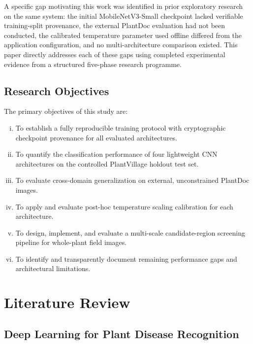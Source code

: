 \documentclass[pdflatex,sn-mathphys-num]{sn-jnl}
\theoremstyle{thmstyleone}%
\theoremstyle{thmstyletwo}%
\theoremstyle{thmstylethree}%
\begin{document}
A specific gap motivating this work was identified in prior exploratory research on the
same system: the initial MobileNetV3-Small checkpoint lacked verifiable training-split
provenance, the external PlantDoc evaluation had not been conducted, the calibrated
temperature parameter used offline differed from the application configuration, and no
multi-architecture comparison existed. This paper directly addresses each of these gaps
using completed experimental evidence from a structured five-phase research programme.

\subsection{Research Objectives}
\label{sec:objectives}

The primary objectives of this study are:
\begin{enumerate}[(i)]
  \item To establish a fully reproducible training protocol with cryptographic checkpoint
        provenance for all evaluated architectures.
  \item To quantify the classification performance of four lightweight CNN architectures
        on the controlled PlantVillage holdout test set.
  \item To evaluate cross-domain generalization on external, unconstrained PlantDoc images.
  \item To apply and evaluate post-hoc temperature scaling calibration for each architecture.
  \item To design, implement, and evaluate a multi-scale candidate-region screening
        pipeline for whole-plant field images.
  \item To identify and transparently document remaining performance gaps and
        architectural limitations.
\end{enumerate}


\section{Literature Review}
\label{sec:literature_review}

\subsection{Deep Learning for Plant Disease Recognition}
\end{document}

